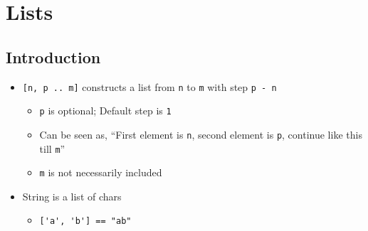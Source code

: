 
\section{Lists}
\subsection{Introduction}
\begin{itemize}
     If \verb+T+ is a type then \verb+[T]+ is a type
        \begin{itemize}
            \item Is a new type constructor
        \end{itemize}
     \verb+[] :: [T]+
     \verb+(x : xs) :: [T]+ iff \verb+x :: T+ and \verb+xs :: [T]+
        \begin{itemize}
             \verb+:+ prepends an element to a list
                \begin{itemize}
                     \verb|++| concatenates two lists
                \end{itemize}
            \item \verb+[a, b, c]+ is syntactic sugar for \verb+a : (b : (c : []))+
        \end{itemize}
    \item \verb+[n, p .. m]+ constructs a list from \verb+n+ to \verb+m+ with step \verb+p - n+
        \begin{itemize}
            \item \verb+p+ is optional; Default step is \verb+1+
            \item Can be seen as, ``First element is \verb+n+, second element is \verb+p+, continue like this till \verb+m+''
            \item \verb+m+ is not necessarily included
        \end{itemize}
    \item String is a list of chars
        \begin{itemize}
            \item \verb+['a', 'b'] == "ab"+
        \end{itemize}
\end{itemize}

